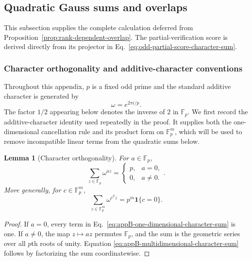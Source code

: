 \documentclass[11pt]{article}
\newcommand{\F}{\mathbb F}
\newcommand{\1}{\mathbf 1}
\theoremstyle{plain}
\newtheorem{lemma}[theorem]{Lemma}
\theoremstyle{definition}
\theoremstyle{remark}
\begin{document}
\subsection{Quadratic Gauss sums and overlaps}
\label{app:quadratic-Gauss-sums}

This subsection supplies the complete calculation deferred from
Proposition~\ref{prop:rank-dependent-overlap}.  The partial-verification score
is derived directly from its projector in
Eq.~\eqref{eq:odd-partial-score-character-sum}.

\subsubsection{Character orthogonality and additive-character conventions}
\label{appsubsec:character-orthogonality}

Throughout this appendix, $p$ is a fixed odd prime and the standard additive
character is generated by
\begin{equation}
  \omega=e^{2\pi i/p}.
  \label{eq:appB-omega}
\end{equation}
The factor $1/2$ appearing below denotes the inverse of $2$ in $\F_p$.
We first record the additive-character identity used repeatedly in the proof.
It supplies both the one-dimensional cancellation rule and its product form on
$\F_p^m$, which will be used to remove incompatible linear terms from the
quadratic sums below.

\begin{lemma}[Character orthogonality]
\label{lem:appB-character-orthogonality}
For $a\in\F_p$,
\begin{equation}
  \sum_{z\in\F_p}\omega^{az}
  =
  \begin{cases}
    p,&a=0,\\
    0,&a\ne0.
  \end{cases}.
  \label{eq:appB-one-dimensional-character-sum}
\end{equation}
More generally, for $c\in\F_p^m$,
\begin{equation}
  \sum_{z\in\F_p^m}\omega^{c^Tz}
  =p^m\mathbf 1\{c=0\}.
  \label{eq:appB-multidimensional-character-sum}
\end{equation}
\end{lemma}

\begin{proof}
If $a=0$, every term in
Eq.~\eqref{eq:appB-one-dimensional-character-sum} is one.  If $a\ne0$, the
map $z\mapsto az$ permutes $\F_p$, and the sum is the geometric series over
all $p$th roots of unity.  Equation
\eqref{eq:appB-multidimensional-character-sum} follows by factorizing the sum
coordinatewise.
\end{proof}
\end{document}
